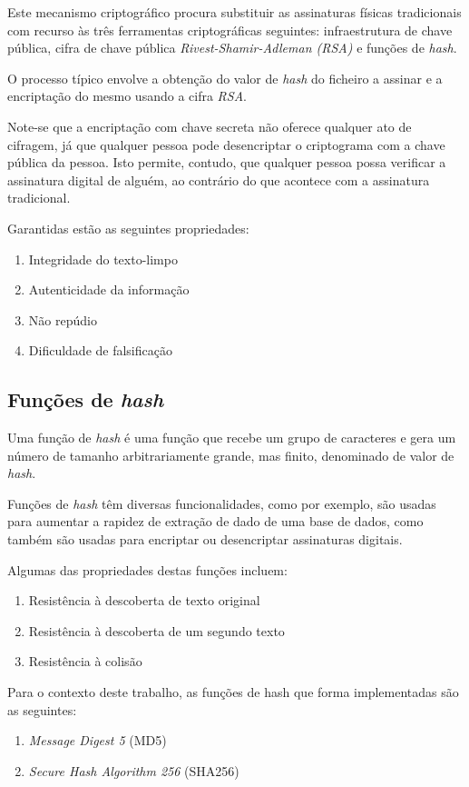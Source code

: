 Este mecanismo criptográfico procura substituir as assinaturas físicas tradicionais com recurso às três ferramentas criptográficas seguintes: infraestrutura de chave pública, cifra de chave pública \textit{Rivest-Shamir-Adleman (RSA)} e funções de \textit{hash}. \par

O processo típico envolve a obtenção do valor de \textit{hash} do ficheiro a assinar e a encriptação do mesmo usando a cifra \textit{RSA}. \par
Note-se que a encriptação com chave secreta não oferece qualquer ato de cifragem, já que qualquer pessoa pode desencriptar o criptograma com a chave pública da pessoa. Isto permite, contudo, que qualquer pessoa possa verificar a assinatura digital de alguém, ao contrário do que acontece com a assinatura tradicional. \par
Garantidas estão as seguintes propriedades: \par
\begin{enumerate}
    \item Integridade do texto-limpo
    \item Autenticidade da informação
    \item Não repúdio
    \item Dificuldade de falsificação
\end{enumerate}

\subsection{Funções de \textit{hash}}
Uma função de \textit{hash} é uma função que recebe um grupo de caracteres e gera um número de tamanho arbitrariamente grande, mas finito, denominado de valor de \textit{hash}. \par
Funções de \textit{hash} têm diversas funcionalidades, como por exemplo, são usadas para  aumentar a rapidez de extração de dado de uma base de dados, como também são usadas para encriptar ou desencriptar assinaturas digitais. \par
Algumas das propriedades destas funções incluem:
\begin{enumerate}
    \item Resistência à descoberta de texto original
    \item Resistência à descoberta de um segundo texto
    \item Resistência à colisão
\end{enumerate}
Para o contexto deste trabalho, as funções de hash que forma implementadas são as seguintes:
\begin{enumerate}
    \item\textit{ Message Digest 5} (MD5)
    \item \textit{Secure Hash Algorithm 256} (SHA256)
\end{enumerate}




